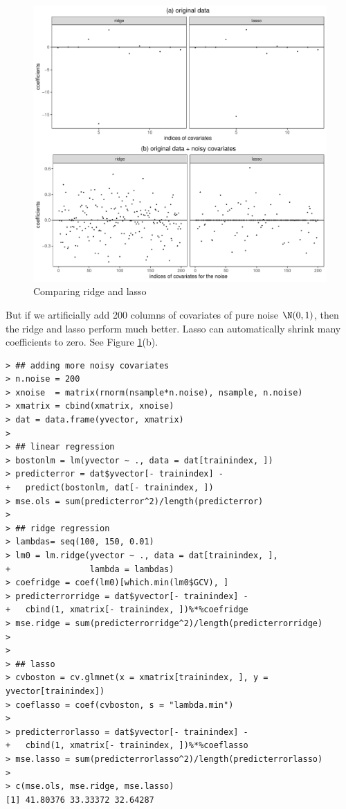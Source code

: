 \begin{figure}[ht]
\centering
\includegraphics[width = \textwidth]{figures/ridge_lasso_coef_bostonhousing.pdf}
\caption{Comparing ridge and lasso}
\label{fig::ridge-lasso-coefficients-boston}
\end{figure}



But if we artificially add 200 columns of covariates of pure noise $\N(0,1)$, then the ridge and lasso perform much better. Lasso can automatically shrink many coefficients to zero. See   Figure \ref{fig::ridge-lasso-coefficients-boston}(b). 

\begin{lstlisting}
> ## adding more noisy covariates
> n.noise = 200
> xnoise  = matrix(rnorm(nsample*n.noise), nsample, n.noise)
> xmatrix = cbind(xmatrix, xnoise)
> dat = data.frame(yvector, xmatrix)
> 
> ## linear regression
> bostonlm = lm(yvector ~ ., data = dat[trainindex, ])
> predicterror = dat$yvector[- trainindex] - 
+   predict(bostonlm, dat[- trainindex, ])
> mse.ols = sum(predicterror^2)/length(predicterror)
> 
> ## ridge regression 
> lambdas= seq(100, 150, 0.01)
> lm0 = lm.ridge(yvector ~ ., data = dat[trainindex, ],
+                lambda = lambdas)
> coefridge = coef(lm0)[which.min(lm0$GCV), ]
> predicterrorridge = dat$yvector[- trainindex] -
+   cbind(1, xmatrix[- trainindex, ])%*%coefridge
> mse.ridge = sum(predicterrorridge^2)/length(predicterrorridge)
> 
> 
> ## lasso 
> cvboston = cv.glmnet(x = xmatrix[trainindex, ], y = yvector[trainindex])
> coeflasso = coef(cvboston, s = "lambda.min")
> 
> predicterrorlasso = dat$yvector[- trainindex] -
+   cbind(1, xmatrix[- trainindex, ])%*%coeflasso
> mse.lasso = sum(predicterrorlasso^2)/length(predicterrorlasso)
> 
> c(mse.ols, mse.ridge, mse.lasso)
[1] 41.80376 33.33372 32.64287
\end{lstlisting}



